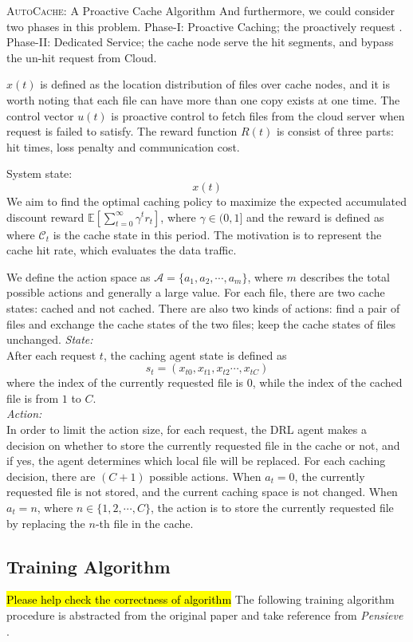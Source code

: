 \documentclass{article}
\begin{document}
\begin{section}{\textsc{AutoCache}: A Proactive Cache Algorithm}
    And furthermore, we could consider two phases in this problem.
    Phase-I: Proactive Caching; the proactively request .
    Phase-II: Dedicated Service; the cache node serve the hit segments, and bypass the un-hit request from Cloud.

    $x(t)$ is defined as the location distribution of files over cache nodes, and it is worth noting that each file can have more than one copy exists at one time.
    The control vector $u(t)$ is proactive control to fetch files from the cloud server when request is failed to satisfy.
    The reward function $R(t)$ is consist of three parts: hit times, loss penalty and communication cost.

    System state:
    $$
    x(t)
    $$
    We aim to find the optimal caching policy to maximize the expected accumulated discount reward $\mathbb{E}\left[\sum_{t=0}^{\infty}\gamma^tr_t\right]$, where $\gamma\in(0,1]$ and the reward is defined as where $\mathcal{C}_t$ is the cache state in this period. The motivation is to represent the cache hit rate, which evaluates the data traffic.

    We define the action space as $\mathcal{A}=\{a_1,a_2,\cdots,a_m\}$, where $m$ describes the total possible actions and generally a large value. For each file, there are two cache states: cached and not cached. There are also two kinds of actions: find a pair of files and exchange the cache states of the two files; keep the cache states of files unchanged.
    \emph{State:}\\
    After each request $t$, the caching agent state is defined as
    $$
        s_t=\left(x_{t0},x_{t1},x_{t2}\cdots,x_{tC}\right)
    $$
    where the index of the currently requested file is $0$, while the index of the cached file is from $1$ to $C$.\\
    \emph{Action:}\\
    In order to limit the action size, for each request, the DRL agent makes a decision on whether to store the currently requested file in the cache or not, and if yes, the agent determines which local file will be replaced. For each caching decision, there are $(C+1)$ possible actions. When $a_t=0$, the currently requested file is not stored, and the current caching space is not changed. When $a_t=n$, where $n\in\{1,2,\cdots,C\}$, the action is to store the currently requested file by replacing the $n$-th file in the cache.
    

    \subsection{Training Algorithm}
    \hl{Please help check the correctness of algorithm}
    The following training algorithm procedure is abstracted from the original paper \cite{a3c} and take reference from \textit{Pensieve} \cite{Pensieve}.


\end{section}
\end{document}
